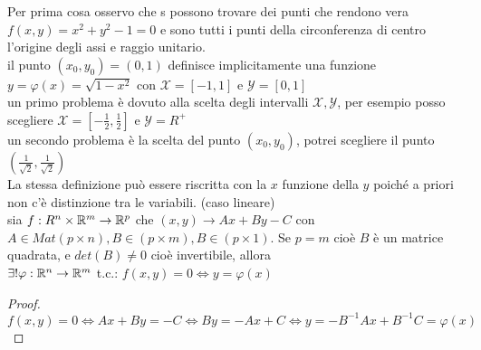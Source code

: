 	Per prima cosa osservo che s possono trovare dei punti che rendono vera $f(x,y)=x^2+y^2-1=0$ e sono tutti i punti della circonferenza di centro l'origine degli assi e raggio unitario.\\
	il punto $(x_0,y_0)=(0,1)$ definisce implicitamente una funzione $y=\varphi(x)=\sqrt{1-x^2}$ con $\mathcal{X}=[-1,1]$ e $\mathcal{Y}=[0,1]$\\
	un primo problema è dovuto alla scelta degli intervalli $\mathcal{X},\mathcal{Y}$, per esempio posso scegliere $\mathcal{X}=[-\frac{1}{2},\frac{1}{2}]$ e $\mathcal{Y}=R^+$\\
	un secondo problema è la scelta del punto $(x_0,y_0)$, potrei scegliere il punto $(\frac{1}{\sqrt{2}},\frac{1}{\sqrt{2}})$\\
\observation
La stessa definizione può essere riscritta con la $x$ funzione della $y$ poiché a priori non c'è distinzione tra le variabili.
\proposition (caso lineare)\\
sia $f:R^n\times \mathbb{R}^m\rightarrow \mathbb{R}^p$ che $(x,y)\rightarrow Ax+By-C$ con $A\in Mat(p \times n), B\in (p \times m), B\in (p \times 1)$. Se $p=m$ cioè $B$ è un matrice quadrata, e $det(B)\ne 0$ cioè invertibile, allora\\
$\exists !\varphi : \mathbb{R}^n\rightarrow \mathbb{R}^m$ t.c.: $f(x,y)=0 \iff y=\varphi(x)$
\begin{proof}
	$f(x,y)=0\iff Ax+By=-C\iff By=-Ax+C\iff y=-B^{-1}Ax+B^{-1}C = \varphi(x)$
\end{proof}
